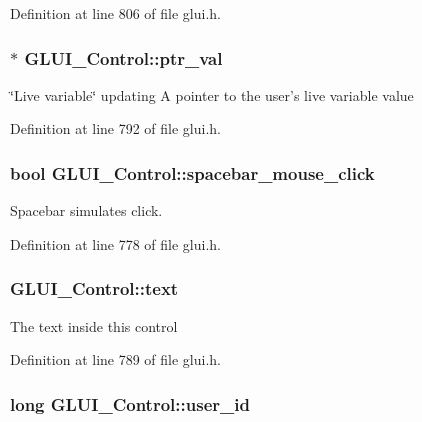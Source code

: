 Definition at line 806 of file glui.\+h.

\hypertarget{class_g_l_u_i___control_a0890ea809b8d980695939e1d92a0af47}{
\subsubsection[{ptr\+\_\+val}]{$\ast$ G\+L\+U\+I\+\_\+\+Control\+::ptr\+\_\+val}}\label{class_g_l_u_i___control_a0890ea809b8d980695939e1d92a0af47}
\char`\"{}\+Live variable\char`\"{} updating A pointer to the user's live variable value 

Definition at line 792 of file glui.\+h.

\hypertarget{class_g_l_u_i___control_a023da130fb762f944077c55d90aec839}{
\subsubsection[{spacebar\+\_\+mouse\+\_\+click}]{\setlength{\rightskip}{0pt plus 5cm}bool G\+L\+U\+I\+\_\+\+Control\+::spacebar\+\_\+mouse\+\_\+click}}\label{class_g_l_u_i___control_a023da130fb762f944077c55d90aec839}


Spacebar simulates click. 



Definition at line 778 of file glui.\+h.

\hypertarget{class_g_l_u_i___control_af0d60e9736f4dbc34e9a536e75876d72}{
\subsubsection[{text}]{ G\+L\+U\+I\+\_\+\+Control\+::text}}\label{class_g_l_u_i___control_af0d60e9736f4dbc34e9a536e75876d72}
The text inside this control 

Definition at line 789 of file glui.\+h.

\hypertarget{class_g_l_u_i___control_a6c88b7c72b0800f88a5d4cda4868c8b6}{
\subsubsection[{user\+\_\+id}]{\setlength{\rightskip}{0pt plus 5cm}long G\+L\+U\+I\+\_\+\+Control\+::user\+\_\+id}}\label{class_g_l_u_i___control_a6c88b7c72b0800f88a5d4cda4868c8b6}


